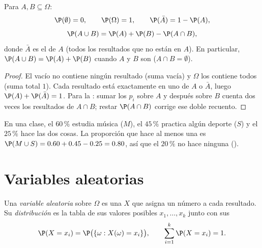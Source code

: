 \begin{proposition}\label{prop:g11:prob:rules}
Para  $A, B \subseteq \Omega$:
\[
\P(\emptyset) = 0, \qquad \P(\Omega) = 1, \qquad
\P(\bar A) = 1 - \P(A),
\]
\[
\P(A \cup B) = \P(A) + \P(B) - \P(A \cap B),
\]
donde $\bar A$ es el \emph{} de $A$ (todos los resultados
que no están en $A$). En particular, $\P(A \cup B) = \P(A) + \P(B)$ cuando
$A$ y $B$ son \emph{} ($A \cap B = \emptyset$).
\end{proposition}

\begin{proof}
El  vacío no contiene ningún resultado (suma vacía) y $\Omega$ los
contiene todos (suma total $1$). Cada resultado está exactamente en uno de
$A$ o $\bar A$, luego $\P(A) + \P(\bar A) = 1$. Para la : sumar los
$p_i$ sobre $A$ y después sobre $B$ cuenta dos veces los resultados de
$A \cap B$; restar $\P(A \cap B)$ corrige ese doble recuento.
\end{proof}

\begin{example}
En una clase, el $60\,\%$ estudia música ($M$), el $45\,\%$ practica algún
deporte ($S$) y el $25\,\%$ hace las dos cosas. La proporción que hace al
menos una es $\P(M \cup S) = 0.60 + 0.45 - 0.25 = 0.80$, así que el
$20\,\%$ no hace ninguna ().
\end{example}

\section{Variables aleatorias}

\begin{definition}\label{def:g11:prob:rv}
Una \emph{variable aleatoria} sobre $\Omega$ es
una  $X$ que asigna un número a cada resultado. Su
\emph{distribución} es la tabla de sus valores
posibles $x_1, \dots, x_k$ junto con sus 
\[
\P(X = x_i) = \P\bigl(\{\omega : X(\omega) = x_i\}\bigr),
\qquad
\sum_{i=1}^k \P(X = x_i) = 1 .
\]
\end{definition}


